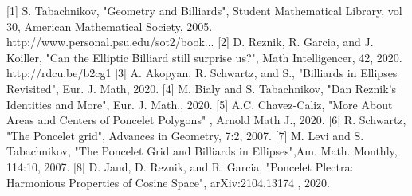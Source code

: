 [1] S. Tabachnikov, "Geometry and Billiards", Student Mathematical Library, vol 30, American Mathematical Society, 2005. http://www.personal.psu.edu/sot2/book...​
[2] D. Reznik, R. Garcia, and J. Koiller, "Can the Elliptic Billiard still surprise us?", Math Intelligencer, 42, 2020. http://rdcu.be/b2cg1​
[3] A. Akopyan, R. Schwartz, and S., "Billiards in Ellipses Revisited", Eur. J. Math, 2020. 
[4] M. Bialy and S. Tabachnikov, "Dan Reznik's Identities and More",
Eur. J. Math., 2020.
[5] A.C. Chavez-Caliz, "More About Areas and Centers of Poncelet Polygons" , Arnold Math J., 2020.
[6] R. Schwartz,  "The Poncelet grid", Advances in Geometry, 7:2, 2007.
[7] M. Levi and  S. Tabachnikov, "The Poncelet Grid and Billiards in Ellipses",Am. Math. Monthly,  114:10, 2007.
[8] D. Jaud, D. Reznik, and R. Garcia, "Poncelet Plectra: Harmonious Properties of Cosine Space", arXiv:2104.13174 , 2020.